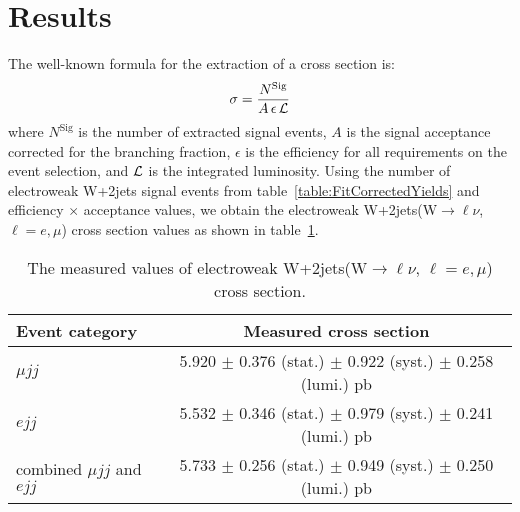 \clearpage{}
\section{Results}
\label{sec:results}
\par
The well-known formula for the extraction of  a cross section is:
\begin{equation}
\label{eq:xsec}
 \sigma = \frac{N^{\text{Sig}}}
               { A \, \epsilon \, {\cal{L}} }
\end{equation}
where $N^{\text{Sig}}$ is the number of extracted signal events,
$A$ is the signal acceptance corrected for the branching fraction,
$\epsilon$ is the efficiency for all requirements on 
the event selection, and ${\cal{L}}$ is the integrated luminosity.
Using the number of electroweak W+2jets signal events from 
table~\ref{table:FitCorrectedYields} and efficiency $\times$ 
acceptance values, we obtain the 
electroweak W+2jets(W$\to\ell\nu$, $\ell=e,\mu$) cross section values as shown in 
table~\ref{tab:measuredCrossSection}.
\begin{table}[h]
\begin{center}
  \begin{tabular}{l c}
    \hline  \hline
    Event category &  Measured cross section\\
    \hline
    $\mu jj$        &  5.920 $\pm$ 0.376 (stat.) $\pm$ 0.922 (syst.) $\pm$ 0.258 (lumi.) pb\\
    $ejj$           &  5.532 $\pm$ 0.346 (stat.) $\pm$ 0.979 (syst.) $\pm$ 0.241 (lumi.) pb\\   
    combined $\mu jj$ and $ejj$ & 5.733 $\pm$ 0.256 (stat.) $\pm$ 0.949 (syst.) $\pm$ 0.250 (lumi.) pb\\
    \hline  \hline
  \end{tabular}
\end{center}
\caption{\label{tab:measuredCrossSection}
The measured values of electroweak W+2jets(W$\to\ell\nu$, $\ell=e,\mu$) cross section. 
}
\end{table}


